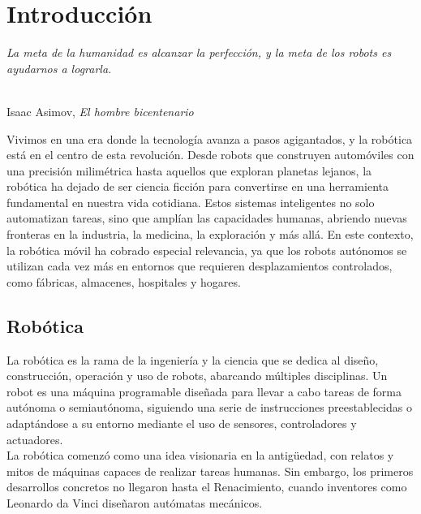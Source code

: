 \chapter{Introducción}
\label{cap:capitulo1}
\setcounter{page}{1}

\begin{flushright}
\begin{minipage}[]{10cm}
\emph{La meta de la humanidad es alcanzar la perfección, y la meta de los robots es ayudarnos a lograrla.}\\
\end{minipage}\\

Isaac Asimov, \textit{El hombre bicentenario}\\
\end{flushright}

\vspace{1cm}

Vivimos en una era donde la tecnología avanza a pasos agigantados, y la robótica está en el centro de esta revolución. Desde robots que construyen automóviles con una precisión milimétrica hasta aquellos que exploran planetas lejanos, la robótica ha dejado de ser ciencia ficción para convertirse en una herramienta fundamental en nuestra vida cotidiana. Estos sistemas inteligentes no solo automatizan tareas, sino que amplían las capacidades humanas, abriendo nuevas fronteras en la industria, la medicina, la exploración y más allá. En este contexto, la robótica móvil ha cobrado especial relevancia, ya que los robots autónomos se utilizan cada vez más en entornos que requieren desplazamientos controlados, como fábricas, almacenes, hospitales y hogares.\\

\section{Robótica}
\label{sec:miseccion} %

La robótica es la rama de la ingeniería y la ciencia que se dedica al diseño, construcción, operación y uso de robots, abarcando múltiples disciplinas. Un robot es una máquina programable diseñada para llevar a cabo tareas de forma autónoma o semiautónoma, siguiendo una serie de instrucciones preestablecidas o adaptándose a su entorno mediante el uso de sensores, controladores y actuadores. \\

La robótica comenzó como una idea visionaria en la antigüedad, con relatos y mitos de máquinas capaces de realizar tareas humanas. Sin embargo, los primeros desarrollos concretos no llegaron hasta el Renacimiento, cuando inventores como Leonardo da Vinci diseñaron autómatas mecánicos. \\

